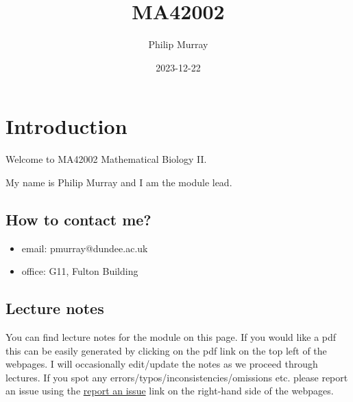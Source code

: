 \documentclass[
  letterpaper,
  DIV=11,
  numbers=noendperiod]{scrreprt}
\title{MA42002}
\author{Philip Murray}
\date{2023-12-22}
\providecommand{\tightlist}{%
  \setlength{\itemsep}{0pt}\setlength{\parskip}{0pt}}\usepackage{longtable,booktabs,array}
\renewcommand*\contentsname{Table of contents}
\newcommand\contentsname{Table of contents}
\theoremstyle{plain}
\theoremstyle{definition}
\theoremstyle{plain}
\theoremstyle{remark}
\begin{document}
\maketitle
\ifdefined\Shaded\renewenvironment{Shaded}{\begin{tcolorbox}[enhanced, interior hidden, borderline west={3pt}{0pt}{shadecolor}, breakable, sharp corners, boxrule=0pt, frame hidden]}{\end{tcolorbox}}\fi

\renewcommand*\contentsname{Table of contents}
{
\hypersetup{linkcolor=}
\setcounter{tocdepth}{1}
\tableofcontents
}

\hypertarget{introduction}{%
\chapter*{Introduction}\label{introduction}}


Welcome to MA42002 Mathematical Biology II.

My name is Philip Murray and I am the module lead.

\hypertarget{how-to-contact-me}{%
\section*{How to contact me?}\label{how-to-contact-me}}


\begin{itemize}
\tightlist
\item
  email: pmurray@dundee.ac.uk
\item
  office: G11, Fulton Building
\end{itemize}

\hypertarget{lecture-notes}{%
\section*{Lecture notes}\label{lecture-notes}}


You can find lecture notes for the module on this page. If you would
like a pdf this can be easily generated by clicking on the pdf link on
the top left of the webpages. I will occasionally edit/update the notes
as we proceed through lectures. If you spot any
errors/typos/inconsistencies/omissions etc. please report an issue using
the \href{https://github.com/dundeemath/MA42002/issues/new}{report an
issue} link on the right-hand side of the webpages.
\end{document}
